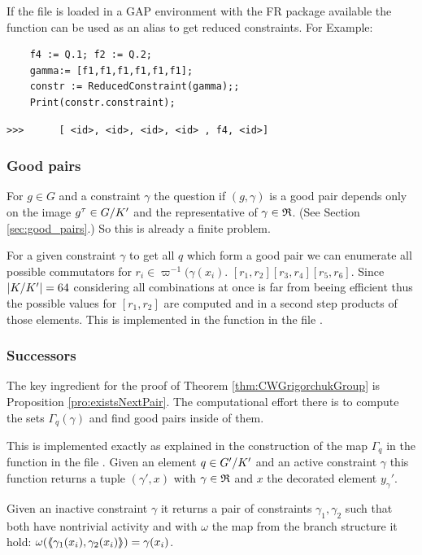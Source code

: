 \documentclass[a4paper,11pt]{amsart}
\begin{document}
If the file  is loaded in a GAP environment with the FR package available 
the function  can be used as an alias to get 
reduced constraints. For Example:
 \begin{lstlisting}
    f4 := Q.1; f2 := Q.2;
    gamma:= [f1,f1,f1,f1,f1,f1];
    constr := ReducedConstraint(gamma);;
    Print(constr.constraint);
\end{lstlisting} 
\begin{verbatim}
>>>      [ <id>, <id>, <id>, <id> , f4, <id>]
\end{verbatim} 

\subsubsection{Good pairs}
For $g\in G$ and a constraint $\gamma$ the question if $(g,\gamma)$ is a good
pair depends only on the image $g^\tau\in{G/K'}$ and the representative
of $\gamma\in\mathfrak{R}$. (See Section \ref{sec:good_pairs}.) So this is already a
finite problem. 

For a given constraint $\gamma$ to get all $q$ which form a good pair we can
enumerate all possible commutators for $r_i\in\varpi^{-1}(\gamma(x_i)$.
$[r_1,r_2][r_3,r_4][r_5,r_6]$. Since $\lvert{K/K'}\rvert=64$ considering all 
combinations at once is far from beeing efficient thus the possible values for
$[r_1,r_2]$ are computed and in a second step products of those elements.
This is implemented in the function  in the file
.
\subsubsection{Successors}
The key ingredient for the proof of Theorem \ref{thm:CWGrigorchukGroup} is
Proposition \ref{pro:existsNextPair}. The computational effort there is
to compute the sets $\Gamma_q(\gamma)$ and find good pairs inside of them.

This is implemented exactly as explained in the construction of the map
$\Gamma_q$ in the function  in the file 
. Given an element $q\in{G'/K'}$ 
and an active constraint $\gamma$ this function returns a tuple $(\gamma',x)$ 
with $\gamma\in\mathfrak{R}$ and $x$ the decorated element $y_\gamma'$.

Given an inactive constraint $\gamma$ it returns a pair of constraints
$\gamma_1,\gamma_2$ such that both have nontrivial activity and with
$\omega$ the map from the branch structure it hold:
$\omega(\langle\negthickspace\langle\gamma_1(x_i),\gamma_2(x_i)\rangle\negthickspace\rangle)=\gamma(x_i)$. 
\end{document}

